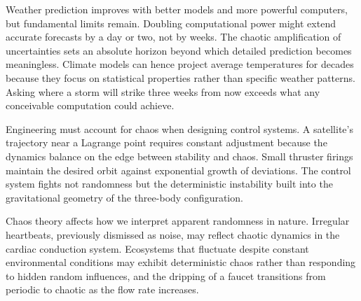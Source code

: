 Weather prediction improves with better models and more powerful computers, but fundamental limits remain. Doubling computational power might extend accurate forecasts by a day or two, not by weeks. The chaotic amplification of uncertainties sets an absolute horizon beyond which detailed prediction becomes meaningless. Climate models can hence project average temperatures for decades because they focus on statistical properties rather than specific weather patterns. Asking where a storm will strike three weeks from now exceeds what any conceivable computation could achieve.

Engineering must account for chaos when designing control systems. A satellite's trajectory near a Lagrange point requires constant adjustment because the dynamics balance on the edge between stability and chaos. Small thruster firings maintain the desired orbit against exponential growth of deviations. The control system fights not randomness but the deterministic instability built into the gravitational geometry of the three-body configuration.

Chaos theory affects how we interpret apparent randomness in nature. Irregular heartbeats, previously dismissed as noise, may reflect chaotic dynamics in the cardiac conduction system. Ecosystems that fluctuate despite constant environmental conditions may exhibit deterministic chaos rather than responding to hidden random influences, and the dripping of a faucet transitions from periodic to chaotic as the flow rate increases.